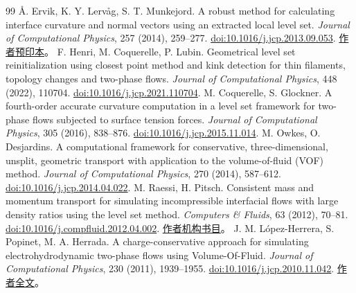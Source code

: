 \documentclass[11pt,a4paper]{article}
\newcommand{\doi}[1]{\href{https://doi.org/#1}{doi:#1}}
\begin{document}
\begin{thebibliography}{99}
 Å. Ervik, K. Y. Lervåg, S. T. Munkejord. A robust method for calculating interface curvature and normal vectors using an extracted local level set. \emph{Journal of Computational Physics}, 257 (2014), 259--277. \doi{10.1016/j.jcp.2013.09.053}. \href{https://arxiv.org/abs/1405.0829}{作者预印本}。
 F. Henri, M. Coquerelle, P. Lubin. Geometrical level set reinitialization using closest point method and kink detection for thin filaments, topology changes and two-phase flows. \emph{Journal of Computational Physics}, 448 (2022), 110704. \doi{10.1016/j.jcp.2021.110704}.
 M. Coquerelle, S. Glockner. A fourth-order accurate curvature computation in a level set framework for two-phase flows subjected to surface tension forces. \emph{Journal of Computational Physics}, 305 (2016), 838--876. \doi{10.1016/j.jcp.2015.11.014}.
 M. Owkes, O. Desjardins. A computational framework for conservative, three-dimensional, unsplit, geometric transport with application to the volume-of-fluid (VOF) method. \emph{Journal of Computational Physics}, 270 (2014), 587--612. \doi{10.1016/j.jcp.2014.04.022}.
 M. Raessi, H. Pitsch. Consistent mass and momentum transport for simulating incompressible interfacial flows with large density ratios using the level set method. \emph{Computers \& Fluids}, 63 (2012), 70--81. \doi{10.1016/j.compfluid.2012.04.002}. \href{https://publications.rwth-aachen.de/record/217833}{作者机构书目}。
 J. M. López-Herrera, S. Popinet, M. A. Herrada. A charge-conservative approach for simulating electrohydrodynamic two-phase flows using Volume-Of-Fluid. \emph{Journal of Computational Physics}, 230 (2011), 1939--1955. \doi{10.1016/j.jcp.2010.11.042}. \href{https://gerris.dalembert.upmc.fr/papers/ehd.pdf}{作者全文}。
\end{thebibliography}
\end{document}
